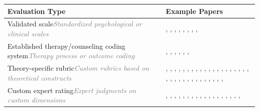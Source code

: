 \begin{table}[tbp]
\centering
\small
\begin{tabular}{p{6cm}p{8cm}}
\toprule
\textbf{Evaluation Type} & \textbf{Example Papers} \\
\midrule
Validated scale\newline\textcolor{gray}{\footnotesize{\textit{Standardized psychological or clinical scales}}} & \cite{Xiao2024HealMe}, \cite{Qiu2025EmoAgent}, \cite{Li2024Understanding}, \cite{Wang2024Towards}, \cite{Schmidmaier2025Using}, \cite{Schmidmaier2025UsingNonverbal}, \cite{Yang2025CAMI}, \cite{Chen2025MIND}, \cite{Wang2025Psychological} \\
\midrule
Established therapy/counseling coding system\newline\textcolor{gray}{\footnotesize{\textit{Therapy process or outcome coding}}} & \cite{Xiao2024HealMe}, \cite{Zhang2025CBT-BENCH}, \cite{Lee2024CACTUS}, \cite{Feng2025Reframe}, \cite{Kim2025MIRROR}, \cite{Kim2025Can}, \cite{Tanana2019Development} \\
\midrule
Theory-specific rubric\newline\textcolor{gray}{\footnotesize{\textit{Custom rubrics based on theoretical constructs}}} & \cite{Xiao2024HealMe}, \cite{Gabriel2024Can}, \cite{Qiu2025EmoAgent}, \cite{Aghakhani2025From}, \cite{Wang2025CARE-Bench}, \cite{Sungarda2025GenAI}, \cite{Liu2023ChatCounselor}, \cite{Chiu2024A}, \cite{Li2024Understanding}, \cite{Wang2024Towards}, \cite{Fouda2026PsychiatryBench}, \cite{Cai2026Exploring}, \cite{Qiu2026PsyCLIENT}, \cite{Nguyen2025Do}, \cite{Zhang2025CBT-BENCH}, \cite{Kim2025KMI}, \cite{Xu2025MentalChat16K}, \cite{Ozgun2025Trustworthy}, \cite{Louie2026Can}, \cite{Louie2024Roleplay-doh}, \cite{Wang2024PATIENT}, \cite{Lee2024CACTUS}, \cite{Basar2024To}, \cite{Yang2025Consistent}, \cite{Yang2025CAMI}, \cite{Basar2025How}, \cite{Feng2025Reframe}, \cite{Kim2025MIRROR}, \cite{Kim2025Can}, \cite{Samuel2025PersonaGym}, \cite{Chen2025MIND}, \cite{Na2024CBT-LLM}, \cite{Sharma2023Cognitive}, \cite{Kang2024Can}, \cite{Wang2025Psychological} \\
\midrule
Custom expert rating\newline\textcolor{gray}{\footnotesize{\textit{Expert judgments on custom dimensions}}} & \cite{Xiao2024HealMe}, \cite{Gabriel2024Can}, \cite{Haydarov2025Towards}, \cite{Wang2025CARE-Bench}, \cite{Qiu2026PsyCLIENT}, \cite{Kim2025KMI}, \cite{Louie2026Can}, \cite{Louie2024Roleplay-doh}, \cite{Wang2024PATIENT}, \cite{Basar2024To}, \cite{Yang2025Consistent}, \cite{Basar2025How}, \cite{Kim2025MIRROR}, \cite{Liu2025Eeyore}, \cite{Na2024CBT-LLM}, \cite{Sharma2023Cognitive}, \cite{Kang2024Can}, \cite{Schmidgall2025AgentClinic}, \cite{Wang2025Psychological} \\

\end{tabular}
\end{table}

